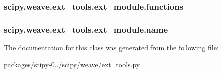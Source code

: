 \subsubsection[{functions}]{\setlength{\rightskip}{0pt plus 5cm}scipy.\+weave.\+ext\+\_\+tools.\+ext\+\_\+module.\+functions}\label{classscipy_1_1weave_1_1ext__tools_1_1ext__module_a1174fde4f3b4be3ff2166d3dc1e4909f}
\hypertarget{classscipy_1_1weave_1_1ext__tools_1_1ext__module_af571ac68685fa160fe8c642428aab51b}{}
\subsubsection[{name}]{\setlength{\rightskip}{0pt plus 5cm}scipy.\+weave.\+ext\+\_\+tools.\+ext\+\_\+module.\+name}\label{classscipy_1_1weave_1_1ext__tools_1_1ext__module_af571ac68685fa160fe8c642428aab51b}


The documentation for this class was generated from the following file\+:\begin{DoxyCompactItemize}
\item 
packages/scipy-\/0../scipy/weave/\hyperlink{ext__tools_8py}{ext\+\_\+tools.\+py}\end{DoxyCompactItemize}
